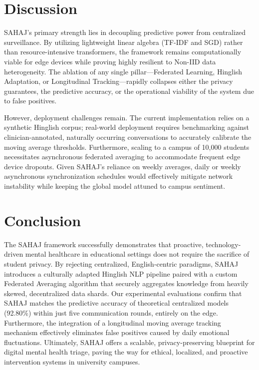 \documentclass[conference]{IEEEtran}
\begin{document}
\section{Discussion}
SAHAJ's primary strength lies in decoupling predictive power from centralized surveillance. By utilizing lightweight linear algebra (TF-IDF and SGD) rather than resource-intensive transformers, the framework remains computationally viable for edge devices while proving highly resilient to Non-IID data heterogeneity. The ablation of any single pillar---Federated Learning, Hinglish Adaptation, or Longitudinal Tracking---rapidly collapses either the privacy guarantees, the predictive accuracy, or the operational viability of the system due to false positives.

However, deployment challenges remain. The current implementation relies on a synthetic Hinglish corpus; real-world deployment requires benchmarking against clinician-annotated, naturally occurring conversations to accurately calibrate the moving average thresholds. Furthermore, scaling to a campus of 10,000 students necessitates asynchronous federated averaging to accommodate frequent edge device dropouts. Given SAHAJ's reliance on weekly averages, daily or weekly asynchronous synchronization schedules would effectively mitigate network instability while keeping the global model attuned to campus sentiment.

\section{Conclusion}
The SAHAJ framework successfully demonstrates that proactive, technology-driven mental healthcare in educational settings does not require the sacrifice of student privacy. By rejecting centralized, English-centric paradigms, SAHAJ introduces a culturally adapted Hinglish NLP pipeline paired with a custom Federated Averaging algorithm that securely aggregates knowledge from heavily skewed, decentralized data shards. Our experimental evaluations confirm that SAHAJ matches the predictive accuracy of theoretical centralized models (92.80\%) within just five communication rounds, entirely on the edge. Furthermore, the integration of a longitudinal moving average tracking mechanism effectively eliminates false positives caused by daily emotional fluctuations. Ultimately, SAHAJ offers a scalable, privacy-preserving blueprint for digital mental health triage, paving the way for ethical, localized, and proactive intervention systems in university campuses.
\end{document}

